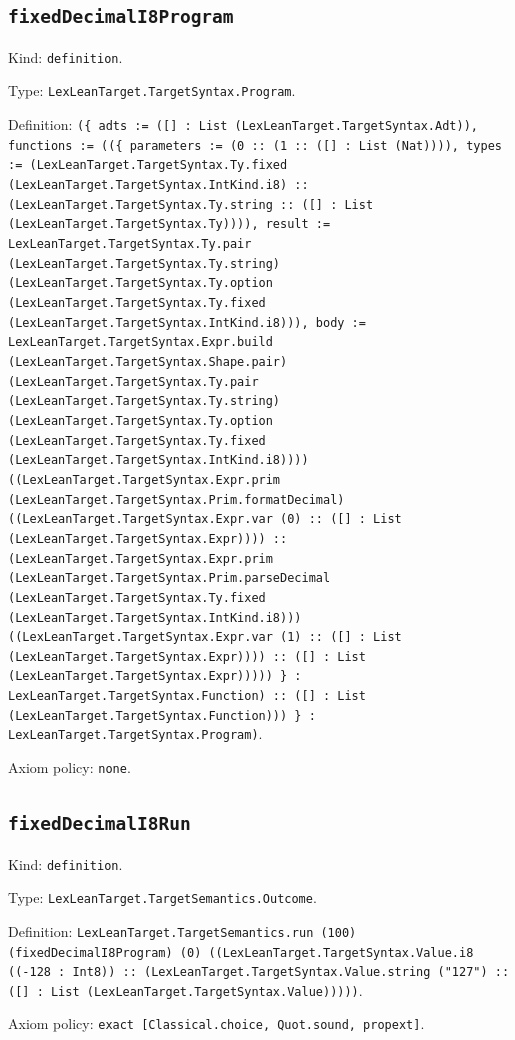 \documentclass[11pt]{article}
\begin{document}
\subsection*{\texttt{fixedDecimalI8Program}}
\noindent Kind: \texttt{definition}.\par
\noindent Type: \texttt{LexLeanTarget.TargetSyntax.Program}.\par
\noindent Definition: \texttt{(\{ adts := ([] : List (LexLeanTarget.TargetSyntax.Adt)), functions := ((\{ parameters := (0 :: (1 :: ([] : List (Nat)))), types := (LexLeanTarget.TargetSyntax.Ty.fixed (LexLeanTarget.TargetSyntax.IntKind.i8) :: (LexLeanTarget.TargetSyntax.Ty.string :: ([] : List (LexLeanTarget.TargetSyntax.Ty)))), result := LexLeanTarget.TargetSyntax.Ty.pair (LexLeanTarget.TargetSyntax.Ty.string) (LexLeanTarget.TargetSyntax.Ty.option (LexLeanTarget.TargetSyntax.Ty.fixed (LexLeanTarget.TargetSyntax.IntKind.i8))), body := LexLeanTarget.TargetSyntax.Expr.build (LexLeanTarget.TargetSyntax.Shape.pair) (LexLeanTarget.TargetSyntax.Ty.pair (LexLeanTarget.TargetSyntax.Ty.string) (LexLeanTarget.TargetSyntax.Ty.option (LexLeanTarget.TargetSyntax.Ty.fixed (LexLeanTarget.TargetSyntax.IntKind.i8)))) ((LexLeanTarget.TargetSyntax.Expr.prim (LexLeanTarget.TargetSyntax.Prim.formatDecimal) ((LexLeanTarget.TargetSyntax.Expr.var (0) :: ([] : List (LexLeanTarget.TargetSyntax.Expr)))) :: (LexLeanTarget.TargetSyntax.Expr.prim (LexLeanTarget.TargetSyntax.Prim.parseDecimal (LexLeanTarget.TargetSyntax.Ty.fixed (LexLeanTarget.TargetSyntax.IntKind.i8))) ((LexLeanTarget.TargetSyntax.Expr.var (1) :: ([] : List (LexLeanTarget.TargetSyntax.Expr)))) :: ([] : List (LexLeanTarget.TargetSyntax.Expr))))) \} : LexLeanTarget.TargetSyntax.Function) :: ([] : List (LexLeanTarget.TargetSyntax.Function))) \} : LexLeanTarget.TargetSyntax.Program)}.\par
\noindent Axiom policy: \texttt{none}.\par
\subsection*{\texttt{fixedDecimalI8Run}}
\noindent Kind: \texttt{definition}.\par
\noindent Type: \texttt{LexLeanTarget.TargetSemantics.Outcome}.\par
\noindent Definition: \texttt{LexLeanTarget.TargetSemantics.run (100) (fixedDecimalI8Program) (0) ((LexLeanTarget.TargetSyntax.Value.i8 ((-128 : Int8)) :: (LexLeanTarget.TargetSyntax.Value.string ("127") :: ([] : List (LexLeanTarget.TargetSyntax.Value)))))}.\par
\noindent Axiom policy: \texttt{exact [Classical.choice, Quot.sound, propext]}.\par
\end{document}

